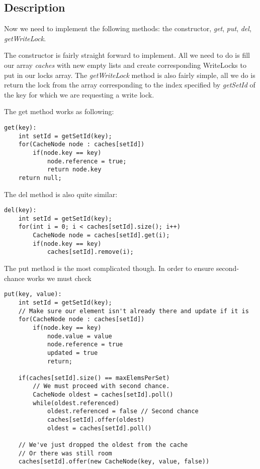 \documentclass{article}
\begin{document}
\subsection*{Description}
Now we need to implement the following methods: the constructor, \textit{get}, \textit{put}, \textit{del}, \textit{getWriteLock}.

The constructor is fairly straight forward to implement. All we need to do is fill our array \textit{caches} with new empty lists and
create corresponding WriteLocks to put in our locks array. The \textit{getWriteLock} method is also fairly simple, all we do is return the
lock from the array corresponding to the index specified by \textit{getSetId} of the key for which we are requesting a write lock.

The get method works as following:
\begin{verbatim}
get(key):
    int setId = getSetId(key);
    for(CacheNode node : caches[setId])
        if(node.key == key)
            node.reference = true;
            return node.key
    return null;
\end{verbatim}

The del method is also quite similar:
\begin{verbatim}
del(key):
    int setId = getSetId(key);
    for(int i = 0; i < caches[setId].size(); i++)
        CacheNode node = caches[setId].get(i);
        if(node.key == key)
            caches[setId].remove(i);
\end{verbatim}

The put method is the most complicated though. In order to ensure second-chance works we must check 
\begin{verbatim}
put(key, value):
    int setId = getSetId(key);
    // Make sure our element isn't already there and update if it is
    for(CacheNode node : caches[setId])
        if(node.key == key)
            node.value = value
            node.reference = true
            updated = true
            return;

    if(caches[setId].size() == maxElemsPerSet)
        // We must proceed with second chance.
        CacheNode oldest = caches[setId].poll()
        while(oldest.referenced)
            oldest.referenced = false // Second chance
            caches[setId].offer(oldest)
            oldest = caches[setId].poll()

    // We've just dropped the oldest from the cache
    // Or there was still room
    caches[setId].offer(new CacheNode(key, value, false))
\end{verbatim} 
\end{document}
